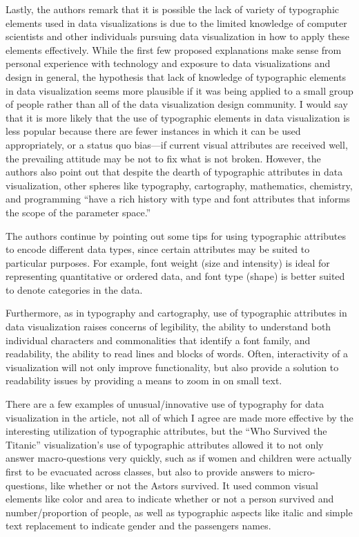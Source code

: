 \documentclass[]{book}
\theoremstyle{definition}
\theoremstyle{definition}
\theoremstyle{definition}
\theoremstyle{remark}
\begin{document}
Lastly, the authors remark that it is possible the lack of variety of
typographic elements used in data visualizations is due to the limited
knowledge of computer scientists and other individuals pursuing data
visualization in how to apply these elements effectively. While the
first few proposed explanations make sense from personal experience with
technology and exposure to data visualizations and design in general,
the hypothesis that lack of knowledge of typographic elements in data
visualization seems more plausible if it was being applied to a small
group of people rather than all of the data visualization design
community. I would say that it is more likely that the use of
typographic elements in data visualization is less popular because there
are fewer instances in which it can be used appropriately, or a status
quo bias---if current visual attributes are received well, the
prevailing attitude may be not to fix what is not broken. However, the
authors also point out that despite the dearth of typographic attributes
in data visualization, other spheres like typography, cartography,
mathematics, chemistry, and programming ``have a rich history with type
and font attributes that informs the scope of the parameter space.''

The authors continue by pointing out some tips for using typographic
attributes to encode different data types, since certain attributes may
be suited to particular purposes. For example, font weight (size and
intensity) is ideal for representing quantitative or ordered data, and
font type (shape) is better suited to denote categories in the data.

Furthermore, as in typography and cartography, use of typographic
attributes in data visualization raises concerns of legibility, the
ability to understand both individual characters and commonalities that
identify a font family, and readability, the ability to read lines and
blocks of words. Often, interactivity of a visualization will not only
improve functionality, but also provide a solution to readability issues
by providing a means to zoom in on small text.

There are a few examples of unusual/innovative use of typography for
data visualization in the article, not all of which I agree are made
more effective by the interesting utilization of typographic attributes,
but the ``Who Survived the Titanic'' visualization's use of typographic
attributes allowed it to not only answer macro-questions very quickly,
such as if women and children were actually first to be evacuated across
classes, but also to provide answers to micro-questions, like whether or
not the Astors survived. It used common visual elements like color and
area to indicate whether or not a person survived and number/proportion
of people, as well as typographic aspects like italic and simple text
replacement to indicate gender and the passengers names.
\end{document}
